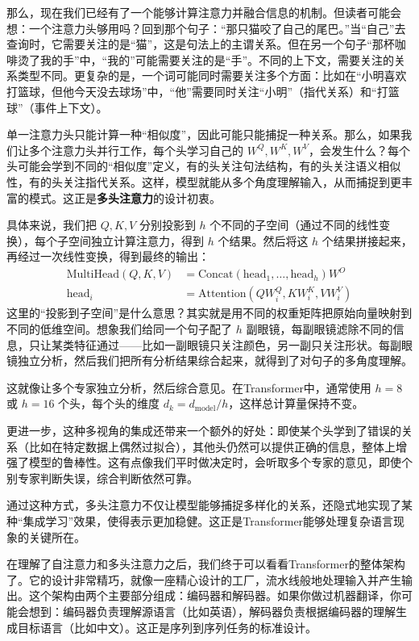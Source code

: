 \documentclass[lang=cn,zihao=-4,a4paper,fontset=windows]{beautybook}
\begin{document}
那么，现在我们已经有了一个能够计算注意力并融合信息的机制。但读者可能会想：一个注意力头够用吗？回到那个句子：“那只猫咬了自己的尾巴。”当“自己”去查询时，它需要关注的是“猫”，这是句法上的主谓关系。但在另一个句子“那杯咖啡烫了我的手”中，“我的”可能需要关注的是“手”。不同的上下文，需要关注的关系类型不同。更复杂的是，一个词可能同时需要关注多个方面：比如在“小明喜欢打篮球，但他今天没去球场”中，“他”需要同时关注“小明”（指代关系）和“打篮球”（事件上下文）。

单一注意力头只能计算一种“相似度”，因此可能只能捕捉一种关系。那么，如果我们让多个注意力头并行工作，每个头学习自己的 \(W^Q, W^K, W^V\)，会发生什么？每个头可能会学到不同的“相似度”定义，有的头关注句法结构，有的头关注语义相似性，有的头关注指代关系。这样，模型就能从多个角度理解输入，从而捕捉到更丰富的模式。这正是\textbf{多头注意力}的设计初衷。

具体来说，我们把 \(Q, K, V\) 分别投影到 \(h\) 个不同的子空间（通过不同的线性变换），每个子空间独立计算注意力，得到 \(h\) 个结果。然后将这 \(h\) 个结果拼接起来，再经过一次线性变换，得到最终的输出：
\[
\begin{aligned}
\text{MultiHead}(Q, K, V) &= \text{Concat}(\text{head}_1, \ldots, \text{head}_h)W^O \\
\text{head}_i &= \text{Attention}(QW_i^Q, KW_i^K, VW_i^V)
\end{aligned}
\]
这里的“投影到子空间”是什么意思？其实就是用不同的权重矩阵把原始向量映射到不同的低维空间。想象我们给同一个句子配了 \(h\) 副眼镜，每副眼镜滤除不同的信息，只让某类特征通过——比如一副眼镜只关注颜色，另一副只关注形状。每副眼镜独立分析，然后我们把所有分析结果综合起来，就得到了对句子的多角度理解。

这就像让多个专家独立分析，然后综合意见。在Transformer中，通常使用 \(h=8\) 或 \(h=16\) 个头，每个头的维度 \(d_k = d_{\text{model}} / h\)，这样总计算量保持不变。

更进一步，这种多视角的集成还带来一个额外的好处：即使某个头学到了错误的关系（比如在特定数据上偶然过拟合），其他头仍然可以提供正确的信息，整体上增强了模型的鲁棒性。这有点像我们平时做决定时，会听取多个专家的意见，即使个别专家判断失误，综合判断依然可靠。

通过这种方式，多头注意力不仅让模型能够捕捉多样化的关系，还隐式地实现了某种“集成学习”效果，使得表示更加稳健。这正是Transformer能够处理复杂语言现象的关键所在。

在理解了自注意力和多头注意力之后，我们终于可以看看Transformer的整体架构了。它的设计非常精巧，就像一座精心设计的工厂，流水线般地处理输入并产生输出。这个架构由两个主要部分组成：编码器和解码器。如果你做过机器翻译，你可能会想到：编码器负责理解源语言（比如英语），解码器负责根据编码器的理解生成目标语言（比如中文）。这正是序列到序列任务的标准设计。
\end{document}
